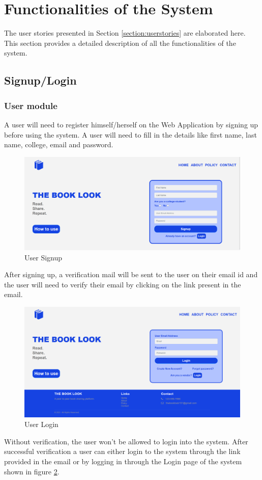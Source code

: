 \documentclass[conference]{IEEEtran}
\begin{document}
\section{Functionalities of the System}
The user stories presented in Section \ref{section:userstories} are elaborated here. This section provides a detailed description of all the functionalities of the system.
\subsection{Signup/Login}

\subsubsection{User module}
A user will need to register himself/herself on the Web Application by signing up before using the system. A user will need to fill in the details like first name, last name, college, email and password. 
\begin{figure}[h]
     \centering
     \includegraphics[scale=0.20,margin=2,frame]{signup.PNG}
     \caption{User Signup}
     \label{fig:signup}
 \end{figure}
After signing up, a verification mail will be sent to the user on their email id and the user will need to verify their email by clicking on the link present in the email.
\begin{figure}[h]
     \centering
     \includegraphics[scale=0.20,margin=2,frame]{login.PNG}
     \caption{User Login}
     \label{fig:login}
 \end{figure}
Without verification, the user won't be allowed to login into the system. After successful verification a user can either login to the system through the link provided in the email or by logging in through the Login page of the system shown in figure \ref{fig:login}.
\vspace{3mm}
\end{document}
